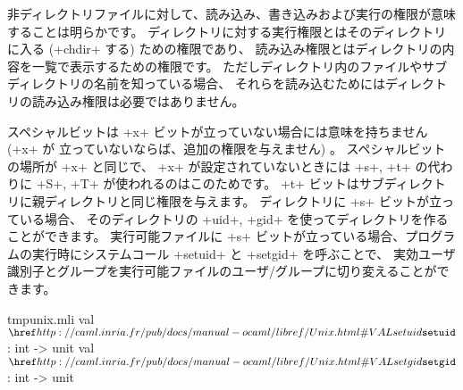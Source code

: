 非ディレクトリファイルに対して、読み込み、書き込みおよび実行の権限が意味することは明らかです。
ディレクトリに対する実行権限とはそのディレクトリに入る (\ml+chdir+ する) ための権限であり、
読み込み権限とはディレクトリの内容を一覧で表示するための権限です。
ただしディレクトリ内のファイルやサブディレクトリの名前を知っている場合、
それらを読み込むためにはディレクトリの読み込み権限は必要ではありません。

スペシャルビットは \ml+x+ ビットが立っていない場合には意味を持ちません
(\ml+x+ が 立っていないならば、追加の権限を与えません) 。
スペシャルビットの場所が \ml+x+ と同じで、
\ml+x+ が設定されていないときには \ml+s+, \ml+t+ の代わりに \ml+S+, \ml+T+ が使われるのはこのためです。
\ml+t+ ビットはサブディレクトリに親ディレクトリと同じ権限を与えます。
ディレクトリに \ml+s+ ビットが立っている場合、 そのディレクトリの \ml+uid+, \ml+gid+ を使ってディレクトリを作ることができます。
実行可能ファイルに \ml+s+ ビットが立っている場合、プログラムの実行時にシステムコール \ml+setuid+ と \ml+setgid+ を呼ぶことで、
実効ユーザ識別子とグループを実行可能ファイルのユーザ/グループに切り変えることができます。
%
\begin{listingcodefile}{tmpunix.mli}
val $\libvalue{Unix}{setuid}$ : int -> unit
val $\libvalue{Unix}{setgid}$ : int -> unit
\end{listingcodefile}
%
